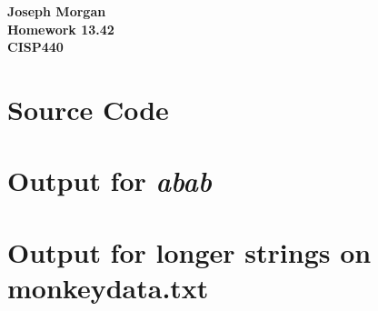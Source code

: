 \documentclass[12pt,titlepage]{article}
\begin{document}
\begin{titlepage}
	\centering
	\vfill
	{\bfseries\Large
		Joseph Morgan\\
		\large
		Homework 13.42\\
		\vskip2cm
		CISP440\\
	}
	\vfill
	\vfill
	\vfill
\end{titlepage}
\section*{Source Code} 



\section*{Output for \textit{abab}}

\section*{Output for longer strings on monkeydata.txt}

\end{document}
